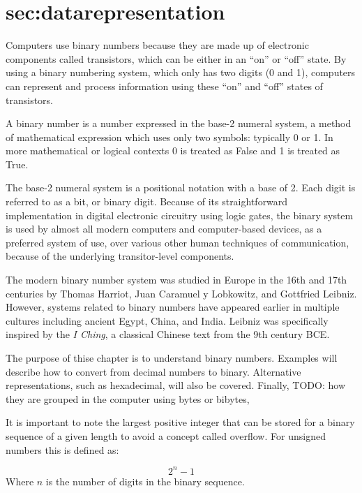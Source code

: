 \documentclass[letterpaper, 12pt]{book}
\begin{document}
\chapter{sec:datarepresentation}

Computers use binary numbers because they are made up of electronic components called transistors, 
which can be either in an ``on'' or ``off'' state. By using a binary numbering system, which only 
has two digits (0 and 1), computers can represent and process information using these ``on'' and 
``off'' states of transistors.

A binary number is a number expressed in the base-2 numeral system, a method of mathematical 
expression which uses only two symbols: typically 0 or 1. In more mathematical or logical contexts 
0 is treated as False and 1 is treated as True.

The base-2 numeral system is a positional notation with a base of 2. Each digit is referred to as 
a bit, or binary digit. Because of its straightforward implementation in digital electronic 
circuitry using logic gates, the binary system is used by almost all modern computers and 
computer-based devices, as a preferred system of use, over various other human techniques of 
communication, because of the underlying transitor-level components.

The modern binary number system was studied in Europe in the 16th and 17th centuries by Thomas 
Harriot, Juan Caramuel y Lobkowitz, and Gottfried Leibniz. However, systems related to binary 
numbers have appeared earlier in multiple cultures including ancient Egypt, China, and India. 
Leibniz was specifically inspired by the \textit{I Ching}, a classical Chinese text from the 9th century BCE. 

The purpose of thise chapter is to understand binary numbers. Examples will describe how to convert
from decimal numbers to binary. Alternative representations, such as hexadecimal, will also be
covered. Finally, TODO: how they are grouped in the computer using bytes or bibytes, 



It is important to note the largest positive integer that can be stored for a binary sequence of a 
given length to avoid a concept called \gls{overflow}. For \gls{unsigned} numbers this is defined as: %

%
\begin{equation} \label{eq:sizeofunsignedint}
    2^n - 1
\end{equation}
%
Where $n$ is the number of digits in the binary sequence. 
\end{document}
